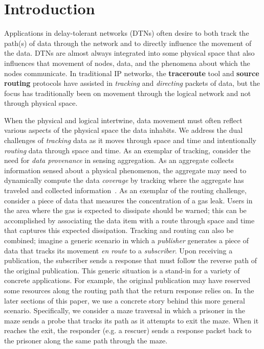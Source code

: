 %
%
\section{Introduction}
Applications in delay-tolerant networks (DTNs) often desire to both track the path(s) of data through the network and to directly influence the movement of the data. DTNs are almost always integrated into some physical space that also influences that movement of nodes, data, and the phenomena about which the nodes communicate. In traditional IP networks, the {\bf traceroute} tool and {\bf source routing} protocols have assisted in {\em tracking} and {\em directing} packets of data, but the focus has traditionally been on movement through the logical network and not through physical space.

When the physical and logical intertwine, data movement must often reflect various aspects of the physical space the data inhabits. We address the dual challenges of {\em tracking} data as it moves through space and time and intentionally {\em routing} data through space and time. As an exemplar of tracking, consider the need for {\em data provenance} in sensing aggregation. As an aggregate collects information sensed about a physical phenomenon, the aggregate may need to dynamically compute the data {\em coverage} by tracking where the aggregate has traveled and collected information~\cite{michel12:spatiotemporal}. As an exemplar of the routing challenge, consider a piece of data that measures the concentration of a gas leak. Users in the area where the gas is expected to dissipate should be warned; this can be accomplished by associating the data item with a route through space and time that captures this expected dissipation. Tracking and routing can also be combined; imagine a generic scenario in which a {\em publisher} generates a piece of data that tracks its movement {\em en route} to a {\em subscriber}. Upon receiving a publication, the subscriber sends a response that must follow the reverse path of the original publication. This generic situation is a stand-in for a variety of concrete applications. For example, the original publication may have reserved some resources along the routing path that the return response relies on. In the later sections of this paper, we use a concrete story behind this more general scenario. Specifically, we consider a maze traversal in which a prisoner in the maze sends a probe that tracks its path as it attempts to exit the maze. When it reaches the exit, the responder (e.g. a rescuer) sends a response packet back to the prisoner along the same path through the maze.

